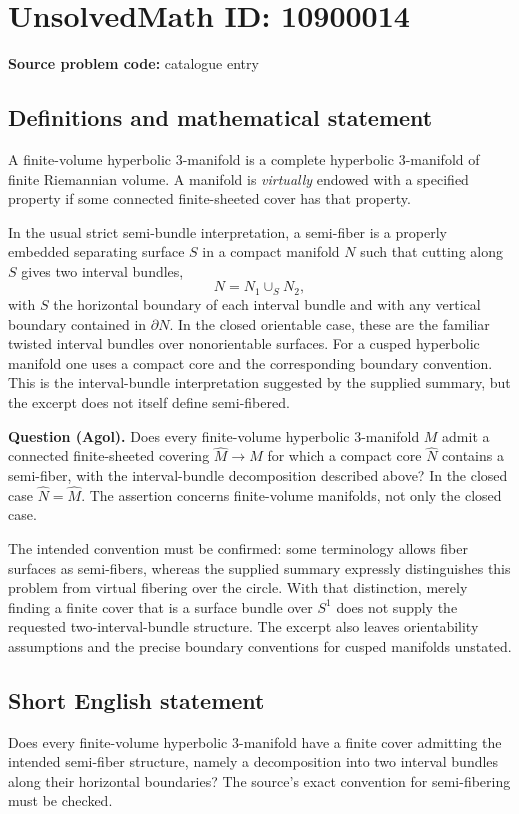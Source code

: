 \documentclass[11pt]{article}
\begin{document}
\section*{UnsolvedMath ID: 10900014}
\textbf{Source problem code:} catalogue entry
\subsection{Definitions and mathematical statement}
A finite-volume hyperbolic $3$-manifold is a complete hyperbolic $3$-manifold of finite Riemannian volume. A manifold is \emph{virtually} endowed with a specified property if some connected finite-sheeted cover has that property.

In the usual strict semi-bundle interpretation, a semi-fiber is a properly embedded separating surface $S$ in a compact manifold $N$ such that cutting along $S$ gives two interval bundles,
\[
 N=N_1\cup_S N_2,
\]
with $S$ the horizontal boundary of each interval bundle and with any vertical boundary contained in $\partial N$. In the closed orientable case, these are the familiar twisted interval bundles over nonorientable surfaces. For a cusped hyperbolic manifold one uses a compact core and the corresponding boundary convention. This is the interval-bundle interpretation suggested by the supplied summary, but the excerpt does not itself define semi-fibered.

\textbf{Question (Agol).} Does every finite-volume hyperbolic $3$-manifold $M$ admit a connected finite-sheeted covering $\widehat M\to M$ for which a compact core $\widehat N$ contains a semi-fiber, with the interval-bundle decomposition described above? In the closed case $\widehat N=\widehat M$. The assertion concerns finite-volume manifolds, not only the closed case.

The intended convention must be confirmed: some terminology allows fiber surfaces as semi-fibers, whereas the supplied summary expressly distinguishes this problem from virtual fibering over the circle. With that distinction, merely finding a finite cover that is a surface bundle over $S^1$ does not supply the requested two-interval-bundle structure. The excerpt also leaves orientability assumptions and the precise boundary conventions for cusped manifolds unstated.
\subsection{Short English statement}
Does every finite-volume hyperbolic $3$-manifold have a finite cover admitting the intended semi-fiber structure, namely a decomposition into two interval bundles along their horizontal boundaries? The source's exact convention for semi-fibering must be checked.
\end{document}
